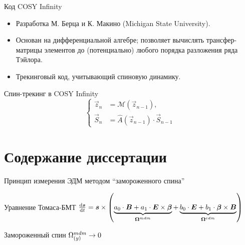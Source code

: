 \documentclass[14pt]{beamer}
\newcommand{\Wedm}{\W^{edm}}
\newcommand{\Wmdm}{\W^{mdm}}
\begin{document}
\begin{frame}{Код COSY Infinity}
	\begin{itemize}
		\item Разработка М. Берца и К. Макино (Michigan State University).
		\item Основан на дифференциальной алгебре; позволяет вычислять трансфер-матрицы элементов до (потенциально) любого порядка разложения ряда Тэйлора.
		\item Трекинговый код, учитывающий спиновую динамику.
	\end{itemize}
\end{frame}
\begin{frame}{Спин-трекинг в COSY Infinity} 
	\[
	\begin{cases}
	\vec{z}_n &= \mathcal{M}(\vec{z}_{n-1}), \\
	\vec{S}_n &= \hat A(\vec z_{n-1})\cdot \vec S_{n-1}
	\end{cases}
	\]
\end{frame}

\section{Содержание диссертации}
\begin{frame}{Принцип измерения ЭДМ методом ``замороженного спина''}
	\begin{block}{Уравнение Томаса-БМТ}
		$\frac{\rd \vec s}{\rd t} = \vec s \times \bkt{\underbrace{a_0\cdot\vec B + a_1\cdot\vec E\times\vec\beta}_{\vec\Wmdm} + \underbrace{b_0\cdot\vec E + b_1\cdot\vec\beta\times\vec B}_{\vec\Wedm}}$
	\end{block}
	\begin{block}{Замороженный спин}
		$\Wmdm_{(y)} \to 0$
	\end{block}
\end{frame}
\end{document}
